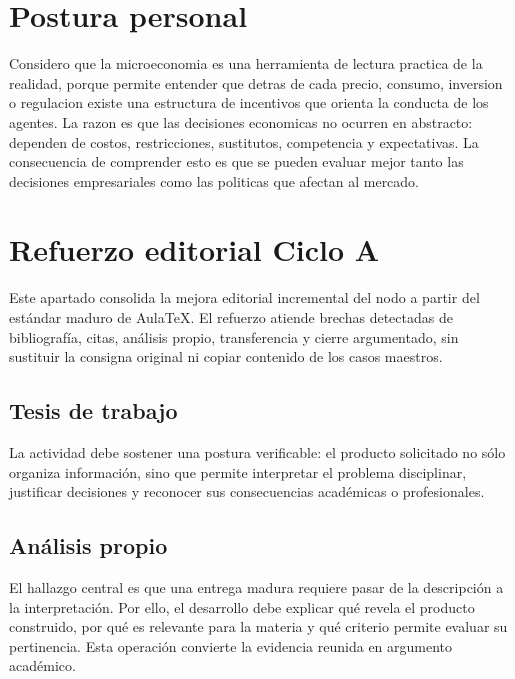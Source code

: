 \documentclass[
	spanish,
	letterpaper, oneside
]{article}
\begin{document}
\section{Postura personal}

Considero que la microeconomia es una herramienta de lectura practica de la realidad, porque permite entender que detras de cada precio, consumo, inversion o regulacion existe una estructura de incentivos que orienta la conducta de los agentes. La razon es que las decisiones economicas no ocurren en abstracto: dependen de costos, restricciones, sustitutos, competencia y expectativas. La consecuencia de comprender esto es que se pueden evaluar mejor tanto las decisiones empresariales como las politicas que afectan al mercado.

\section*{Refuerzo editorial Ciclo A}
Este apartado consolida la mejora editorial incremental del nodo a partir del estándar maduro de AulaTeX. El refuerzo atiende brechas detectadas de bibliografía, citas, análisis propio, transferencia y cierre argumentado, sin sustituir la consigna original ni copiar contenido de los casos maestros.

\subsection*{Tesis de trabajo}
La actividad debe sostener una postura verificable: el producto solicitado no sólo organiza información, sino que permite interpretar el problema disciplinar, justificar decisiones y reconocer sus consecuencias académicas o profesionales.

\subsection*{Análisis propio}
El hallazgo central es que una entrega madura requiere pasar de la descripción a la interpretación. Por ello, el desarrollo debe explicar qué revela el producto construido, por qué es relevante para la materia y qué criterio permite evaluar su pertinencia. Esta operación convierte la evidencia reunida en argumento académico.
\end{document}
